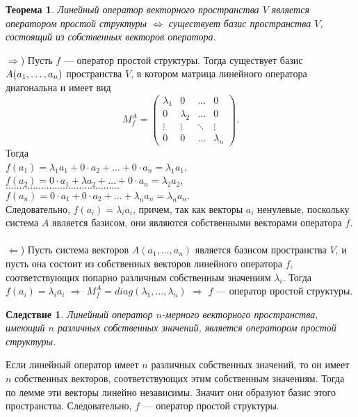 \newtheorem*{th11_7_2}{Теорема}\begin{th11_7_2}Линейный оператор векторного пространства $V$ является оператором простой структуры $\Longleftrightarrow$ существует базис пространства $V$, состоящий из собственных векторов оператора.
\end{th11_7_2}\begin{Proof}
	$\Rightarrow$) Пусть $f$ --- оператор простой структуры. Тогда существует базис $A(a_1,\dots,a_n)$ пространства $V$, в котором матрица линейного оператора диагональна и имеет вид $$M^A_f = \begin{pmatrix} \lambda_1 & 0 & \dots & 0 \\ 0 & \lambda_2 & \dots & 0 \\ \vdots & \vdots & \ddots & \vdots \\ 0 & 0 & \dots & \lambda_n \end{pmatrix}.$$ Тогда \\$f(a_1) = \lambda_1 a_1 + 0\cdot a_2 + \ldots + 0\cdot a_n = \lambda_1 a_1$,\\$f(a_2) = 0\cdot a_1 + \lambda a_2 + \ldots + 0\cdot a_n = \lambda_2 a_2$,\\ $\dots\dots\dots\dots\dots\dots\dots\dots\dots\dots\dots\dots\dots\dots$\\ $f(a_n) =0\cdot a_1 + 0\cdot a_2+\ldots+ \lambda_n a_n = \lambda_n a_n$.\\ Следовательно, $f(a_i) = \lambda_i a_i$, причем, так как векторы $a_i$ ненулевые, поскольку система $A$ является базисом, они являются собственными векторами оператора $f$. \\\\
	$\Leftarrow$) Пусть система векторов $A(a_1, \dots, a_n)$ является базисом пространства $V$, и пусть она состоит из собственных векторов линейного оператора $f$, соответствующих попарно различным собственным значениям $\lambda_i$. Тогда $f(a_i) = \lambda_i a_i$ $\Rightarrow$ $M^A_f = diag(\lambda_1,\dots,\lambda_n)$ $\Rightarrow$ $f$ --- оператор простой структуры.
\end{Proof}
\newtheorem*{cor11_7_2}{Следствие}\begin{cor11_7_2}Линейный оператор $n$-мерного векторного пространства, имеющий $n$ различных собственных значений, является оператором простой структуры.
\end{cor11_7_2}\begin{Proof}
	Если линейный оператор имеет $n$ различных собственных значений, то он имеет $n$ собственных векторов, соответствующих этим собственным значениям. Тогда по лемме эти векторы линейно независимы. Значит они образуют базис этого пространства. Следовательно, $f$ --- оператор простой структуры.
\end{Proof}












